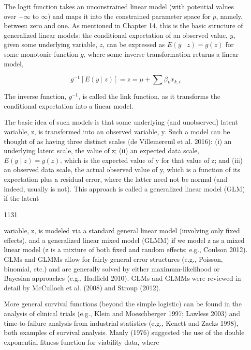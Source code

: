 \documentclass{article}
\begin{document}
The logit function takes an unconstrained linear model (with potential values over  $ -\infty $ to  $ \infty $) and maps it into the constrained parameter space for  $ p $, namely, between zero and one. As mentioned in Chapter 14, this is the basic structure of generalized linear models: the conditional expectation of an observed value,  $ y $, given some underlying variable,  $ z $, can be expressed as  $ E(y \mid z) = g(z) $ for some monotonic function  $ g $, where some inverse transformation returns a linear model,

\begin{equation}
g^{-1}\left[E(y\mid z)\right]=z=\mu+\sum\beta_{k}x_{k,i}
\end{equation}

The inverse function,  $ g^{-1} $, is called the link function, as it transforms the conditional expectation into a linear model.

The basic idea of such models is that some underlying (and unobserved) latent variable, z, is transformed into an observed variable, y. Such a model can be thought of as having three distinct scales (de Villemereuil et al. 2016): (i) an underlying latent scale, the value of z; (ii) an expected data scale,  $ E(y \mid z) = g(z) $, which is the expected value of y for that value of z; and (iii) an observed data scale, the actual observed value of y, which is a function of its expectation plus a residual error, where the latter need not be normal (and indeed, usually is not). This approach is called a generalized linear model (GLM) if the latent

1131

variable, z, is modeled via a standard general linear model (involving only fixed effects), and a generalized linear mixed model (GLMM) if we model z as a mixed linear model (z is a mixture of both fixed and random effects; e.g., Coulson 2012). GLMs and GLMMs allow for fairly general error structures (e.g., Poisson, binomial, etc.) and are generally solved by either maximum-likelihood or Bayesian approaches (e.g., Hadfield 2010). GLMs and GLMMs were reviewed in detail by McCulloch et al. (2008) and Stroup (2012).

More general survival functions (beyond the simple logistic) can be found in the analysis of clinical trials (e.g., Klein and Moeschberger 1997; Lawless 2003) and time-to-failure analysis from industrial statistics (e.g., Kenett and Zacks 1998), both examples of survival analysis. Manly (1976) suggested the use of the double exponential fitness function for viability data, where
\end{document}
